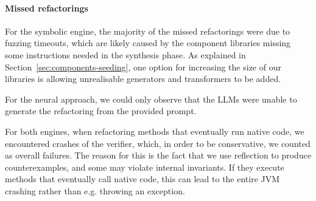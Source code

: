 \documentclass[conference]{IEEEtran}
\begin{document}
\paragraph{Missed refactorings}
%
%
%
For the symbolic engine, the majority of the missed refactorings were due to fuzzing timeouts, which are likely 
caused by the component libraries missing some
instructions needed in the synthesis phase.
As explained in Section~\ref{sec:components-seeding}, one option 
for increasing the size of our libraries 
is allowing unrealisable generators and transformers to
be added.

For the neural approach, we could only observe that the LLMs were unable to generate the refactoring from the provided prompt.

For both engines, when refactoring methods that eventually run native code, we encountered crashes of the verifier, which, in order to be conservative, we counted as overall failures.
The reason for this is the fact that we use reflection to produce counterexamples,
and some may violate internal invariants.
If they execute methods that eventually call native code, this can lead to the entire JVM
crashing rather than e.g. throwing an exception. %
\end{document}
